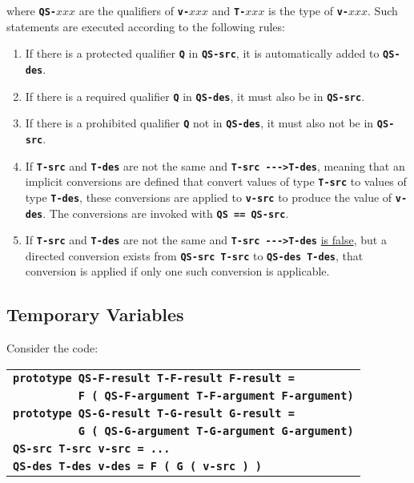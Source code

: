 \documentclass[12pt]{article}
\newcommand{\TT}[1]{{\tt \bfseries #1}}
\begin{document}
where \TT{QS-}$xxx$ are the qualifiers of \TT{v-}$xxx$ and
\TT{T-}$xxx$ is the type of \TT{v-}$xxx$.  Such statements are
executed according to the following rules:

\begin{enumerate}
\item If there is a protected qualifier \TT{Q} in \TT{QS-src}, it
is automatically added to \TT{QS-des}.
\item If there is a required qualifier \TT{Q} in \TT{QS-des}, it
must also be in \TT{QS-src}.
\item If there is a prohibited qualifier \TT{Q} not in \TT{QS-des}, it
must also not be in \TT{QS-src}.
\item If \TT{T-src} and \TT{T-des} are not the same
and \TT{T-src~-{}-{}->T-des},
meaning that an implicit conversions are defined that convert values
of type \TT{T-src} to values of type \TT{T-des}, these conversions are
applied to \TT{v-src} to produce the value of \TT{v-des}.
The conversions are invoked with \TT{QS == QS-src}.
\item
\label{DIRECT-CONVERSION-ASSIGMENTS}
If \TT{T-src} and \TT{T-des} are not the same and \TT{T-src~-{}-{}->T-des}
\underline{is false}, but a directed conversion exists from
\TT{QS-src T-src} to \TT{QS-des T-des}, that conversion is applied
if only one such conversion is applicable.
\end{enumerate}


\subsection{Temporary Variables}
\label{TEMPORARY-VARIABLES}

Consider the code:

\begin{center}
\begin{tabular}{l}
\TT{prototype QS-F-result T-F-result F-result =} \\
\TT{~~~~~~~~~~F ( QS-F-argument T-F-argument F-argument)} \\
\TT{prototype QS-G-result T-G-result G-result =} \\
\TT{~~~~~~~~~~G ( QS-G-argument T-G-argument G-argument)} \\
\TT{QS-src T-src v-src = ...} \\
\TT{QS-des T-des v-des = F ( G ( v-src ) )} \\
\end{tabular}
\end{center}
\end{document}
